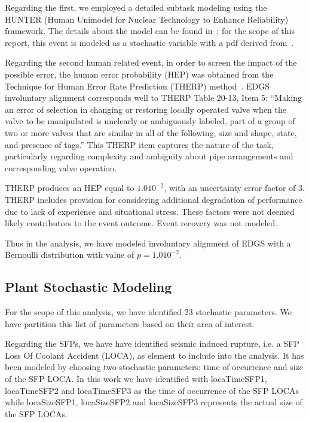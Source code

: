 Regarding the first, we employed a detailed subtask modeling using the HUNTER (Human Unimodel 
for Nuclear Technology to Enhance Reliability)~\cite{boringHUNTER} framework. The details about 
the model can be found in~\cite{hunterReport2016}; for the scope of this report, this event 
is modeled as a stochastic variable with a pdf derived from~\cite{hunterReport2016}. 

Regarding the second human related event, in order to screen the impact of the possible error, 
the human error probability 
(HEP) was obtained from the Technique for Human Error Rate Prediction (THERP) 
method~\cite{NUREGCR1278}. 
EDGS involuntary alignment corresponds well to THERP Table 20-13, Item 5: ``Making an error 
of selection in changing or restoring locally operated valve when the valve to be manipulated 
is unclearly or ambiguously labeled, part of a group of two or more valves that are similar in 
all of the following, size and shape, state, and presence of tags.'' This THERP item captures 
the nature of the task, particularly regarding complexity and ambiguity about pipe arrangements 
and corresponding valve operation. 

THERP produces an HEP equal to $1.0 10^{-2}$, with an uncertainty 
error factor of 3. THERP includes provision for considering additional degradation of performance 
due to lack of experience and situational stress. These factors were not deemed likely contributors 
to the event outcome. Event recovery was not modeled.

Thus in the analysis, we have modeled involuntary alignment of EDGS with a Bernoulli 
distribution with value of $p=1.0 10^{-2}$.

\subsection{Plant Stochastic Modeling}
\label{sec:plantStochasticModeling}
For the scope of this analysis, we have identified 23 stochastic parameters. We have 
partition this list of parameters based on their area of interest.

Regarding the SFPs, we have have identified seismic induced rupture, i.e. a SFP Loss Of
Coolant Accident (LOCA), as 
element to include into the analysis. It has been modeled by choosing two stochastic 
parameters: time of  occurrence and size of the SFP LOCA. In this work we have identified 
with locaTimeSFP1, locaTimeSFP2 and locaTimeSFP3 as the time of occurrence of the SFP 
LOCAs while locaSizeSFP1, locaSizeSFP2 and locaSizeSFP3 represents the actual size of 
the SFP LOCAs.

